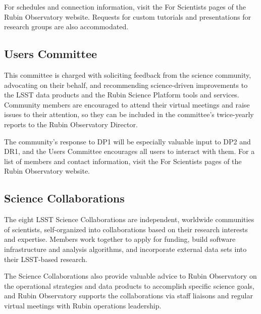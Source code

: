 For schedules and connection information, visit the For Scientists pages of the Rubin Observatory website.
Requests for custom tutorials and presentations for research groups are also accommodated.


\subsection{Users Committee}
\label{ssec:users_committee}

This committee is charged with soliciting feedback from the science community, advocating on their behalf, and recommending science-driven improvements to the \gls{LSST} data products and the Rubin Science Platform tools and services.
Community members are encouraged to attend their virtual meetings and raise issues to their attention, so they can be included in the committee's twice-yearly reports to the Rubin Observatory \gls{Director}.

The community's response to \gls{DP1} will be especially valuable input to \gls{DP2} and \gls{DR1}, and the Users Committee encourages all users to interact with them.
For a list of members and contact information, visit the For Scientists pages of the Rubin Observatory website.


\subsection{Science Collaborations}
\label{ssec:science_collaborations}

The eight \gls{LSST} Science Collaborations are independent, worldwide communities of scientists, self-organized into collaborations based on their research interests and expertise.
Members work together to apply for funding, build software infrastructure and analysis algorithms, and incorporate external data sets into their \gls{LSST}-based research.

The Science Collaborations also provide valuable advice to Rubin Observatory on the operational strategies and data products to accomplish specific science goals, and Rubin Observatory supports the collaborations via staff liaisons and regular virtual meetings with Rubin operations leadership.
